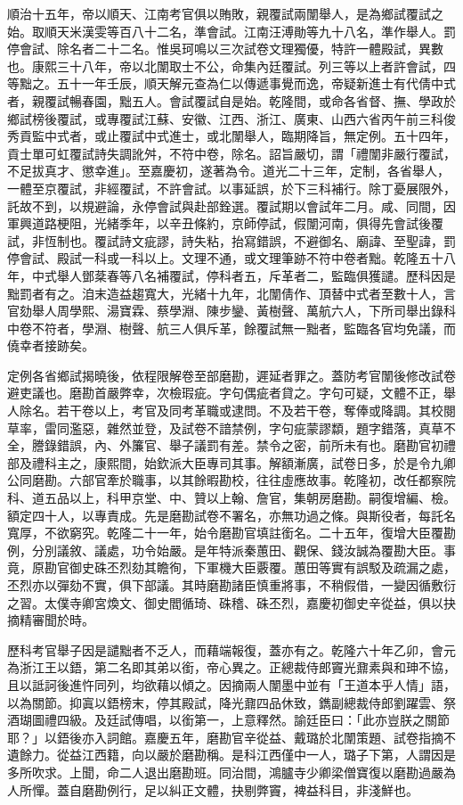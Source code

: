 \begin{pinyinscope}
順治十五年，帝以順天、江南考官俱以賄敗，親覆試兩闈舉人，是為鄉試覆試之始。取順天米漢雯等百八十二名，準會試。江南汪溥勛等九十八名，準作舉人。罰停會試、除名者二十二名。惟吳珂鳴以三次試卷文理獨優，特許一體殿試，異數也。康熙三十八年，帝以北闈取士不公，命集內廷覆試。列三等以上者許會試，四等黜之。五十一年壬辰，順天解元查為仁以傳遞事覺而逸，帝疑新進士有代倩中式者，親覆試暢春園，黜五人。會試覆試自是始。乾隆間，或命各省督、撫、學政於鄉試榜後覆試，或專覆試江蘇、安徽、江西、浙江、廣東、山西六省丙午前三科俊秀貢監中式者，或止覆試中式進士，或北闈舉人，臨期降旨，無定例。五十四年，貢士單可虹覆試詩失調訛舛，不符中卷，除名。詔旨嚴切，謂「禮闈非嚴行覆試，不足拔真才、懲幸進」。至嘉慶初，遂著為令。道光二十三年，定制，各省舉人，一體至京覆試，非經覆試，不許會試。以事延誤，於下三科補行。除丁憂展限外，託故不到，以規避論，永停會試與赴部銓選。覆試期以會試年二月。咸、同間，因軍興道路梗阻，光緒季年，以辛丑條約，京師停試，假闈河南，俱得先會試後覆試，非恆制也。覆試詩文疵謬，詩失粘，抬寫錯誤，不避御名、廟諱、至聖諱，罰停會試、殿試一科或一科以上。文理不通，或文理筆跡不符中卷者黜。乾隆五十八年，中式舉人鄧棻春等八名補覆試，停科者五，斥革者二，監臨俱獲譴。歷科因是黜罰者有之。洎末造益趨寬大，光緒十九年，北闈倩作、頂替中式者至數十人，言官劾舉人周學熙、湯寶霖、蔡學淵、陳步鑾、黃樹聲、萬航六人，下所司舉出錄科中卷不符者，學淵、樹聲、航三人俱斥革，餘覆試無一黜者，監臨各官均免議，而僥幸者接跡矣。

定例各省鄉試揭曉後，依程限解卷至部磨勘，遲延者罪之。蓋防考官闈後修改試卷避吏議也。磨勘首嚴弊幸，次檢瑕疵。字句偶疵者貸之。字句可疑，文體不正，舉人除名。若干卷以上，考官及同考革職或逮問。不及若干卷，奪俸或降調。其校閱草率，雷同濫惡，雜然並登，及試卷不諳禁例，字句疵蒙謬纇，題字錯落，真草不全，謄錄錯誤，內、外簾官、舉子議罰有差。禁令之密，前所未有也。磨勘官初禮部及禮科主之，康熙間，始欽派大臣專司其事。解額漸廣，試卷日多，於是令九卿公同磨勘。六部官牽於職事，以其餘暇勘校，往往虛應故事。乾隆初，改任都察院科、道五品以上，科甲京堂、中、贊以上翰、詹官，集朝房磨勘。嗣復增編、檢。額定四十人，以專責成。先是磨勘試卷不署名，亦無功過之條。與斯役者，每託名寬厚，不欲窮究。乾隆二十一年，始令磨勘官填註銜名。二十五年，復增大臣覆勘例，分別議敘、議處，功令始嚴。是年特派秦蕙田、觀保、錢汝誠為覆勘大臣。事竟，原勘官御史硃丕烈劾其瞻徇，下軍機大臣覈覆。蕙田等實有誤駁及疏漏之處，丕烈亦以彈劾不實，俱下部議。其時磨勘諸臣慎重將事，不稍假借，一變因循敷衍之習。太僕寺卿宮煥文、御史閻循琦、硃稽、硃丕烈，嘉慶初御史辛從益，俱以抉摘精審聞於時。

歷科考官舉子因是譴黜者不乏人，而藉端報復，蓋亦有之。乾隆六十年乙卯，會元為浙江王以鋙，第二名即其弟以銜，帝心異之。正總裁侍郎竇光鼐素與和珅不協，且以詆訶後進忤同列，均欲藉以傾之。因摘兩人闈墨中並有「王道本乎人情」語，以為關節。抑寘以鋙榜末，停其殿試，降光鼐四品休致，鐫副總裁侍郎劉躍雲、祭酒瑚圖禮四級。及廷試傳唱，以銜第一，上意釋然。諭廷臣曰：「此亦豈朕之關節耶？」以鋙後亦入詞館。嘉慶五年，磨勘官辛從益、戴璐於北闈策題、試卷指摘不遺餘力。從益江西籍，向以嚴於磨勘稱。是科江西僅中一人，璐子下第，人謂因是多所吹求。上聞，命二人退出磨勘班。同治間，鴻臚寺少卿梁僧寶復以磨勘過嚴為人所憚。蓋自磨勘例行，足以糾正文體，抉剔弊竇，裨益科目，非淺鮮也。


\end{pinyinscope}

